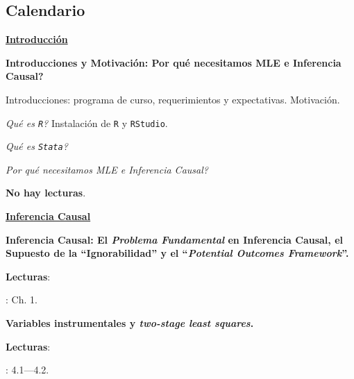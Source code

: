 \documentclass[letterpaper]{article}
\renewenvironment{itemize}{
  \begin{list}{}{
    \setlength{\leftmargin}{1.5em}
  }
}{
  \end{list}
}
\begin{document}
\subsection*{Calendario}


\begin{enumerate}[label=\roman*.] %


  \item {\bf {\color{ForestGreen}\underline{Introducci\'on}}}

			\begin{itemize} 
				\item[1.] {\bf Introducciones y Motivaci\'on: Por qu\'e necesitamos MLE e Inferencia Causal?}
				\begin{itemize} 
					\item[$\circ$] Introducciones: programa de curso, requerimientos y expectativas. Motivaci\'on.
					\item[$\circ$] \emph{Qu\'e es \texttt{R}?} Instalaci\'on de \texttt{R} y \texttt{RStudio}.
					\item[$\circ$] \emph{Qu\'e es \texttt{Stata}?}
					\item[$\circ$] \emph{Por qu\'e necesitamos MLE e Inferencia Causal?}
					\item[$\circ$] {\bf No hay lecturas}.
				\end{itemize}
			\end{itemize}

  \item {\bf {\color{ForestGreen}\underline{Inferencia Causal}}}

            \begin{itemize} 
            \item[2.] {\bf Inferencia Causal: El \emph{Problema Fundamental} en Inferencia Causal, el Supuesto de la ``Ignorabilidad'' y el ``\emph{Potential Outcomes Framework}''.}
                \begin{itemize} 
                \item[$\circ$] {\bf Lecturas}: 
                  \begin{itemize} 
                    \item[$\diamond$] \textcite{Imbens2015}: Ch. 1.
                  \end{itemize}
                \end{itemize}
            \end{itemize}

                        \begin{itemize} 
            \item[3.] {\bf Variables instrumentales y \emph{two-stage least squares}. }
                \begin{itemize} 
                \item[$\circ$] {\bf Lecturas}: 
                  \begin{itemize} 
                    \item[$\diamond$] \textcite{Angrist2009}: 4.1---4.2.
                  \end{itemize}
                \end{itemize}
            \end{itemize}


\end{enumerate}
\end{document}
